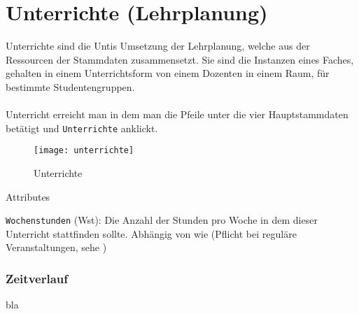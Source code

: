 \section{Unterrichte (Lehrplanung)}

Unterrichte sind die Untis Umsetzung der Lehrplanung, welche aus der Ressourcen der Stammdaten zusammensetzt. Sie sind die Instanzen eines Faches, gehalten in einem Unterrichtsform von einem Dozenten in einem Raum, für bestimmte Studentengruppen.\\
\\
Unterricht erreicht man in dem man die Pfeile unter die vier Hauptstammdaten betätigt und \texttt{Unterrichte} anklickt.

\newpage

\begin{figure}[h]
	\centering
	\texttt{[image: unterrichte]}
	\vspace{-5pt}
	\caption{Unterrichte}
	\label{fig:unterrichte}
\end{figure}

\noindent
{\large Attributes\par}
\vspace{8pt}

\noindent
\texttt{Wochenstunden} (Wst):  Die Anzahl der Stunden pro Woche in dem dieser Unterricht stattfinden sollte. Abhängig von wie (Pflicht bei reguläre Veranstaltungen, sehe )\\

\subsubsection{Zeitverlauf}
\label{sec:zeitverlauf}

bla



